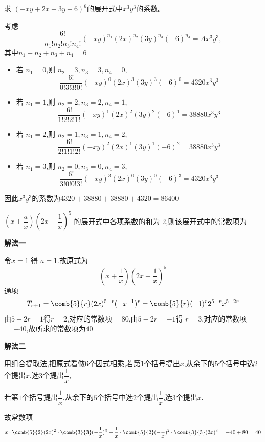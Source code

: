 \begin{questions}
    \question 求 $(-xy+2x+3y-6)^{6}$的展开式中$x^3y^3$的系数。
    \begin{solution}
        考虑
        \[
        \frac{6!}{n_1!n_2!n_3!n_4!} (-xy)^{n_1}(2x)^{n_2}(3y)^{n_3}(-6)^{n_4}=Ax^3y^3,
        \]
        其中$n_1+n_2+n_3+n_4=6$
        \begin{itemize}
        \item 若 \(n_1=0\),则 \(n_2=3, n_3=3, n_4=0\),
        \[
        \frac{6!}{0!3!3!0!}(-xy)^0(2x)^3(3y)^3(-6)^0 = 4320x^3y^3
        \]
        \item 若 \(n_1=1\),则 \(n_2=2, n_3=2, n_4=1\),
        \[
        \frac{6!}{1!2!2!1!}(-xy)^1(2x)^2(3y)^2(-6)^1 = 38880x^3y^3
        \]
        \item 若 \(n_1=2\),则 \(n_2=1, n_3=1, n_4=2\),
        \[
        \frac{6!}{2!1!1!2!}(-xy)^2(2x)^1(3y)^1(-6)^2 = 38880x^3y^3
        \]
        \item 若 \(n_1=3\),则 \(n_2=0, n_3=0, n_4=3\),
        \[
        \frac{6!}{3!0!0!3!}(-xy)^3(2x)^0(3y)^0(-6)^3  = 4320x^3y^3
        \]
        \end{itemize}
        因此$x^3y^3$的系数为$4320 + 38880 + 38880 + 4320 = 86400$
    \end{solution}

    \question \(\left(x + \dfrac{a}{x}\right) \left(2x - \dfrac{1}{x}\right)^5\) 的展开式中各项系数的和为 2,则该展开式中的常数项为  
    \begin{solution}
        \textbf{解法一}
        
        令$x=1$ 得 $a=1$.故原式为 $$(x+\frac{1}{x})(2x-\frac{1}{x})^5$$ 
        通项
        $$T_{r+1}=\comb{5}{r}(2x)^{5-r}(-x^{-1})^r=\comb{5}{r}(-1)^r 2^{5-r}x^{5-2r}$$
        由$5-2r=1$得$r=2$,对应的常数项$=80$,由$5-2r=-1$得
        $r=3$,对应的常数项$=-40$,故所求的常数项为$40$

        \textbf{解法二}
        
        用组合提取法,把原式看做$6$个因式相乘,若第$1$个括号提出$x$,从余下的$5$个括号中选$2$个提出$x$,选$3$个提出$\dfrac{1}{x}$,
        
        若第$1$个括号提出$\dfrac{1}{x}$,从余下的$5$个括号中选$2$个提出$\dfrac{1}{x}$,选$3$个提出$x$.
        
        故常数项$$x \cdot \comb{5}{2}(2x)^2 \cdot \comb{3}{3}(-\frac{1}{x})^3 + \frac{1}{x} \cdot \comb{5}{2}(-\frac{1}{x})^2 \cdot \comb{3}{3}(2x)^3 =-40+80=40$$
    \end{solution}


\end{questions}
